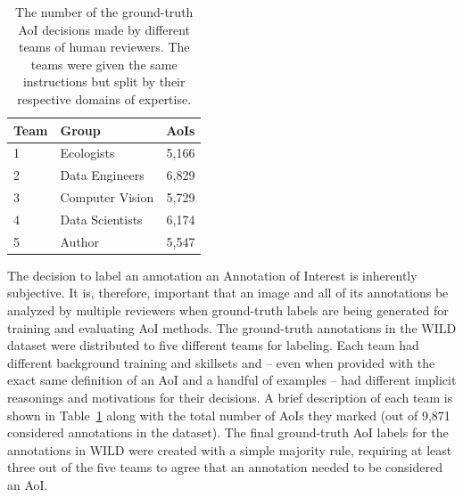 \begin{table}[!t]
    \caption{The number of the ground-truth AoI decisions made by different teams of human reviewers.  The teams were given the same instructions but split by their respective domains of expertise.}
    \label{tab:progress}
    \begin{center}
        \begin{tabular}{| l | l | r |}
            \hline
            \textbf{Team} & \textbf{Group}  & \textbf{AoIs} \\
            \hline\hline
            1             & Ecologists      & 5,166         \\
            \hline
            2             & Data Engineers  & 6,829         \\
            \hline
            3             & Computer Vision & 5,729         \\
            \hline
            4             & Data Scientists & 6,174         \\
            \hline
            5             & Author          & 5,547         \\
            \hline
        \end{tabular}
    \end{center}
\end{table}

The decision to label an annotation an Annotation of Interest is inherently subjective.  It is, therefore, important that an image and all of its annotations be analyzed by multiple reviewers when ground-truth labels are being generated for training and evaluating AoI methods.  The ground-truth annotations in the WILD dataset were distributed to five different teams for labeling.  Each team had different background training and skillsets and -- even when provided with the exact same definition of an AoI and a handful of examples -- had different implicit reasonings and motivations for their decisions.  A brief description of each team is shown in Table~\ref{tab:progress} along with the total number of AoIs they marked (out of 9,871 considered annotations in the dataset).  The final ground-truth AoI labels for the annotations in WILD were created with a simple majority rule, requiring at least three out of the five teams to agree that an annotation needed to be considered an AoI.


